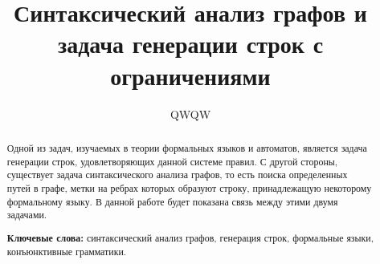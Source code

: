 \documentclass[10pt]{article}
\begin{document}
\title{Синтаксический анализ графов и задача генерации строк с ограничениями}
\author{QWQW}

\maketitle

\begin{abstract}
Одной из задач, изучаемых в теории формальных языков и автоматов, является задача генерации строк, удовлетворяющих данной системе правил. С другой стороны, существует задача синтаксического анализа графов, то есть поиска определенных путей в графе, метки на ребрах которых образуют строку, принадлежащую некоторому формальному языку. В данной работе будет показана связь между этими двумя задачами.

\vspace{1em}
\textbf{Ключевые слова:} синтаксический анализ графов, генерация строк, формальные языки, конъюнктивные грамматики.

\end{abstract}







\setmonofont[Mapping=tex-text]{CMU Typewriter Text}


\end{document}
